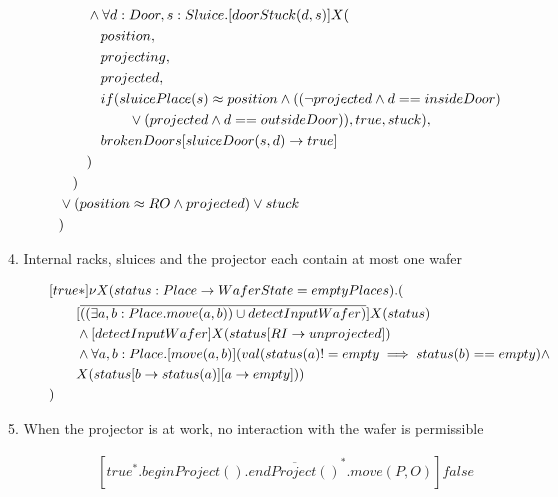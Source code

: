 \begin{description}
\begin{align*}
&  \tab\tab  \wedge \forall d:Door,s:Sluice.[doorStuck(d, s)]X( \\
&  \tab\tab                        \tab                        position, \\
&  \tab\tab                        \tab                        projecting, \\
&  \tab\tab                        \tab                        projected, \\
&  \tab\tab                        \tab                        if(sluicePlace(s) \approx position \wedge ((\neg projected \wedge d == insideDoor) \\
& \tab\tab\tab\tab\tab \vee (projected \wedge d == outsideDoor)), true, stuck), \\
&  \tab\tab                       \tab brokenDoors[sluiceDoor(s,d)\to true] \\
&  \tab\tab                                              ) \\
&  \tab ) \\
&  \vee (position \approx RO \wedge projected) \vee stuck \\
&)
	\end{align*}

 
 \item[4. Internal racks, sluices and the projector each contain at most one wafer]
    
\begin{align*}
		&[true*] \nu X(status:Place \to WaferState=emptyPlaces).(\\
  & \tab\tab [\overline{((\exists a,b:Place.move(a,b)) \cup detectInputWafer)}]X(status)\\
  & \tab\tab  \wedge [detectInputWafer]X(status[RI \to unprojected])\\
  & \tab\tab  \wedge \forall a,b:Place.[move(a, b)](val(status(a) != empty \implies status(b)  == empty) \wedge \\ & \tab \tab X(status[b \to status(a)][a \to empty]))\\
&)
	\end{align*}

 
 \item[5. When the projector is at work, no interaction with the wafer is permissible]
 	\begin{align*}
 		&[true^*.beginProject().\overline{endProject()}^*.move(P,O)]false
	\end{align*}
	

\end{description}
